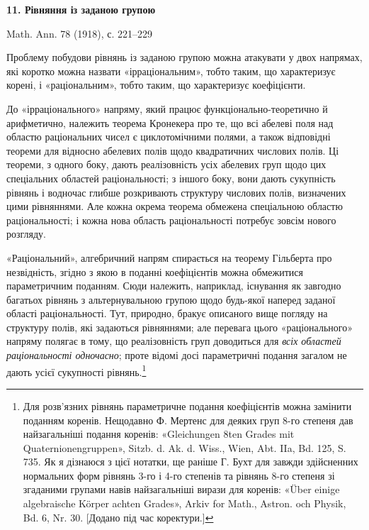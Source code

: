 \documentclass[11pt]{article}
\begin{document}

\begin{center}
{\Large\bfseries 11. Рівняння із заданою групою}\par
\vspace{1.5em}
Math. Ann. 78 (1918), с. 221--229
\end{center}

\vspace{4em}

Проблему побудови рівнянь із заданою групою можна атакувати у двох напрямах, які коротко можна назвати «ірраціональним», тобто таким, що характеризує корені, і «раціональним», тобто таким, що характеризує коефіцієнти.

До «ірраціонального» напряму, який працює функціонально-теоретично й арифметично, належить теорема Кронекера про те, що всі абелеві поля над областю раціональних чисел є циклотомічними полями, а також відповідні теореми для відносно абелевих полів щодо квадратичних числових полів. Ці теореми, з одного боку, дають реалізовність усіх абелевих груп щодо цих спеціальних областей раціональності; з іншого боку, вони дають сукупність рівнянь і водночас глибше розкривають структуру числових полів, визначених цими рівняннями. Але кожна окрема теорема обмежена спеціальною областю раціональності; і кожна нова область раціональності потребує зовсім нового розгляду.

«Раціональний», алгебричний напрям спирається на теорему Гільберта про незвідність, згідно з якою в поданні коефіцієнтів можна обмежитися параметричним поданням. Сюди належить, наприклад, існування як завгодно багатьох рівнянь з альтернувальною групою щодо будь-якої наперед заданої області раціональності. Тут, природно, бракує описаного вище погляду на структуру полів, які задаються рівняннями; але перевага цього «раціонального» напряму полягає в тому, що реалізовність груп доводиться для \emph{всіх областей раціональності одночасно}; проте відомі досі параметричні подання загалом не дають усієї сукупності рівнянь.\footnote{Для розв'язних рівнянь параметричне подання коефіцієнтів можна замінити поданням коренів. Нещодавно Ф. Мертенс для деяких груп 8-го степеня дав найзагальніші подання коренів: «Gleichungen 8ten Grades mit Quaternionengruppen», Sitzb. d. Ak. d. Wiss., Wien, Abt. IIa, Bd. 125, S. 735. Як я дізнаюся з цієї нотатки, ще раніше Г. Бухт для завжди здійсненних нормальних форм рівнянь 3-го і 4-го степенів та рівнянь 8-го степеня зі згаданими групами навів найзагальніші вирази для коренів: «Über einige algebraische Körper achten Grades», Arkiv for Math., Astron. och Physik, Bd. 6, Nr. 30. [Додано під час коректури.]} 
\end{document}
